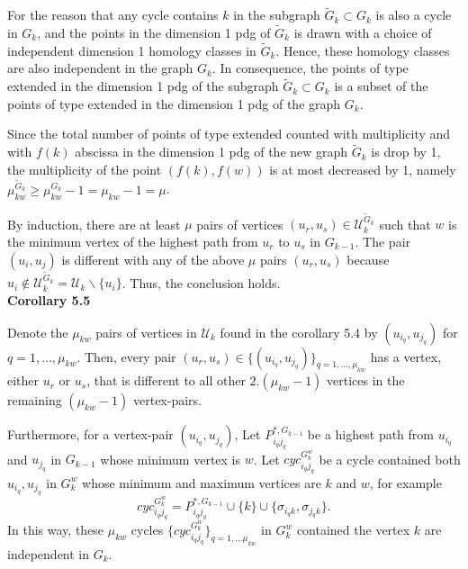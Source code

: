 \documentclass[a4paper,12pt]{article}
\numberwithin{equation}{section}
\begin{document}
	For the reason that any cycle contains $k$ in the subgraph $\tilde{G}_k \subset G_k$ is also a cycle in $G_k$, and the points in the dimension 1 pdg of $\tilde{G}_k$ is drawn with a choice of independent dimension 1 homology classes in $\tilde{G}_k$. Hence, these homology classes are also independent in the graph $G_k$. In consequence, the points of type extended in the dimension 1 pdg of the subgraph $\tilde{G}_k \subset G_k$ is a subset of the points of type extended in the dimension 1 pdg of the graph $G_k$.
	
	Since the total number of points of type extended counted with multiplicity and with $f(k)$ abscissa in the dimension 1 pdg of the new graph $\tilde{G}_k$ is drop by 1, the multiplicity of the point $(f(k),f(w))$ is at most decreased by 1, namely $\mu_{kw}^{\tilde{G}_k} \geq \mu_{kw}^{G_k} -1 = \mu_{kw} -1 = \mu$.
	
	By induction, there are at least $\mu$ pairs of vertices $(u_r, u_s) \in \mathcal{U}^{\tilde{G}_k}_k$ such that $w$ is the minimum vertex of the highest path from $u_r$ to $u_s$ in $G_{k-1}$. The pair $(u_i,u_j)$ is different with any of the above $\mu$ pairs $(u_r,u_s)$ because $u_i \notin \mathcal{U}^{\tilde{G}_k}_k = \mathcal{U}_k \backslash \{u_i\}$. Thus, the conclusion holds.\\


	
	\noindent \textbf{Corollary 5.5}
	
	Denote the $\mu_{kw}$ pairs of vertices in $\mathcal{U}_k$ found in the corollary 5.4 by $(u_{i_q}, u_{j_q})$ for $q = 1,\ldots, \mu_{kw}$. Then, every pair $(u_r, u_s) \in \{(u_{i_q}, u_{j_q})\}_{q = 1,\ldots, \mu_{kw}}$ has a vertex, either $u_r$ or $u_s$, that is different to all other $2.(\mu_{kw}-1)$ vertices in the remaining $(\mu_{kw}-1)$ vertex-pairs.
	
	Furthermore, for a vertex-pair $(u_{i_q},u_{j_q})$, Let $P_{i_q j_q}^{*,G_{k-1}}$ be a highest path from $u_{i_q}$ and $u_{j_q}$ in $G_{k-1}$ whose minimum vertex is $w$. Let $cyc_{i_q j_q}^{G^w_k}$ be a cycle contained both $u_{i_q}, u_{j_q}$ in $G_k^w$ whose minimum and maximum vertices are $k$ and $w$, for example
	$$cyc_{i_q j_q}^{G^w_k} = P_{i_q j_q}^{*,G_{k-1}} \cup \{k \} \cup \{\sigma_{i_q k}, \sigma_{j_q k} \}.$$ 
	In this way, these $\mu_{kw}$ cycles $\{cyc_{i_q j_q}^{G^w_k}\}_{q=1,\ldots \mu_{kw}}$ in $G_k^w$ contained the vertex $k$ are independent in $G_k$.\\
	
\end{document}
